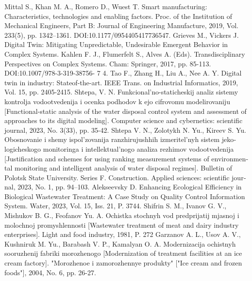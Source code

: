 \documentclass[10pt,final]{article}
\begin{document}
\begin{multicols}{2}
\begin{otherlanguage}{english}
\centering\begin{thebibliography}{11}
\fontsize{8}{5}\selectfont
\setlength{\parindent}{0.0cm}
\setlength{\parskip}{0.0cm}
      Mittal S., Khan M. A., Romero D., Wuest T. Smart manufacturing: Characteristics, technologies and enabling factors. Proc.
of the Institution of Mechanical Engineers, Part B: Journal of
Engineering Manufacture, 2019, Vol. 233(5), pp. 1342–1361.
DOI:10.1177/0954405417736547.
       Grieves M., Vickers J. Digital Twin: Mitigating Unpredictable,
Undesirable Emergent Behavior in Complex Systems. Kahlen
F. J., Flumerfelt S., Alves A. (Eds). Transdisciplinary Perspectives on Complex Systems. Cham: Springer, 2017, pp. 85-113.
DOI:10.1007/978-3-319-38756- 7 4.
       Tao F., Zhang H., Liu A., Nee A. Y. Digital twin in industry: Stateof-the-art. IEEE Trans. on Industrial Informatics, 2019, Vol. 15,
pp. 2405-2415.
       Shtepa, V. N. Funkcional’no-staticheskij analiz sistemy kontrolja vodootvedenija i ocenka podhodov k ejo cifrovomu modelirovaniju [Functional-static analysis of the water disposal control system and assessment of approaches to its digital modeling]. Computer science and cybernetics: scientific journal, 2023,
No. 3(33), pp. 35-42.
       Shtepa V. N., Zolotykh N. Yu., Kireev S. Yu. Obosnovanie i
shemy ispol’zovanija ranzhirujushhih izmeritel’nyh sistem jekologicheskogo monitoringa i intellektual’nogo analiza rezhimov
vodootvedenija [Justification and schemes for using ranking measurement systems of environmental monitoring and intelligent
analysis of water disposal regimes]. Bulletin of Polotsk State
University. Series F. Construction. Applied sciences: scientific
journal, 2023, No. 1, pp. 94–103.
       Alekseevsky D. Enhancing Ecological Efficiency in Biological
Wastewater Treatment: A Case Study on Quality Control Information System. Water, 2023, Vol. 15, Iss. 21, P. 3744.
       Shifrin S. M., Ivanov G. V., Mishukov B. G., Feofanov Yu. A.
Ochistka stochnyh vod predprijatij mjasnoj i molochnoj promyshlennosti [Wastewater treatment of meat and dairy industry enterprises]. Light and food industry, 1981, P. 272
       Garzanov A. L., Usov A. V., Kushniruk M. Yu., Barabash V. P.,
Kamalyan O. A. Modernizacija ochistnyh sooruzhenij fabriki
morozhenogo [Modernization of treatment facilities at an ice
cream factory]. "Morozhenoe i zamorozhennye produkty" ["Ice
cream and frozen foods"], 2004, No. 6, pp. 26-27.

\end{thebibliography}
\end{otherlanguage}
\end{multicols}
\end{document}
